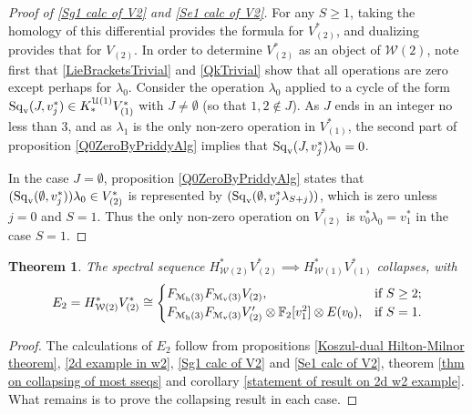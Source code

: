 \documentclass[11pt]{amsart}
\theoremstyle{plain}
\newtheorem{thm}{Theorem}[section]
\theoremstyle{definition}
\newcommand{\calU}{\mathcal{U}}
\newcommand{\calw}{\mathcal{W}}
\newcommand{\calmv}{\mathcal{M}_\textup{v}}
\newcommand{\calmh}{\mathcal{M}_\textup{h}}
\theoremstyle{plain}
\newcommand{\Sqv}{\mathrm{Sq}_\textup{v}}
\newcommand{\F}{\mathbb{F}}
\newcommand{\Ftwo}{\F_2}
\begin{document}
\begin{Calculations of HWn for n nonzero}
\begin{proof}[Proof of \ref{Sg1 calc of V2} and \ref{Se1 calc of V2}]
For any $S\geq1$, taking the homology of this differential provides the formula for $V^*_{(2)}$, and dualizing provides that for $V_{(2)}$.
In order to determine $V^*_{(2)}$ as an object of $\calw(2)$, note first that \ref{LieBracketsTrivial} and \ref{QkTrivial} show that all operations are zero except perhaps for $\lambda_0$. %
Consider the operation $\lambda_0$ applied to a cycle of the form $\Sqv(J,v_{j}^*)\in K_{*}^{\calU(1)}V^*_{(1)}$ with $J\neq\emptyset$ (so that $1,2\notin J$). As $J$ ends in an integer no less than 3, and as $\lambda_1$ is the only non-zero operation in $V^*_{(1)}$, the second part of proposition \ref{Q0ZeroByPriddyAlg} implies that $\Sqv(J,v_{j}^*)\lambda_0=0$.

In the case $J=\emptyset$, proposition \ref{Q0ZeroByPriddyAlg} states that $(\Sqv(\emptyset,v_{j}^*))\lambda_0\in V^*_{(2)}$ is represented by $(\Sqv(\emptyset,v_{j}^*\lambda_{S+j}))$, which is zero unless $j=0$ and $S=1$. Thus the only non-zero operation on $V^*_{(2)}$ is $v_0^*\lambda_0=v_1^*$ in the case $S=1$.
\end{proof}
\begin{thm}\label{W2 to W1 collapse}
The spectral sequence $H^*_{\calw(2)}V^*_{(2)}\implies H^*_{\calw(1)}V^*_{(1)}$ collapses, with
\[E_2=H^*_{\calw(2)}V^*_{(2)}\cong\begin{cases}
F_{\calmh(3)}F_{\calmv(3)}V_{(2)},&\textup{if }S\geq2;\\
F_{\calmh(3)}F_{\calmv(3)}V'_{(2)}\otimes \Ftwo [v_1^{2}]\otimes E(v_0),&\textup{if }S=1.
\end{cases}
\]
\end{thm}
\begin{proof}
The calculations of $E_2$ follow from propositions \ref{Koszul-dual Hilton-Milnor theorem}, \ref{2d example in w2}, \ref{Sg1 calc of V2} and \ref{Se1 calc of V2}, theorem \ref{thm on collapsing of most sseqs} and corollary \ref{statement of result on 2d w2 example}. What remains is to prove the collapsing result in each case.


\end{proof}
\end{Calculations of HWn for n nonzero}
\end{document}
